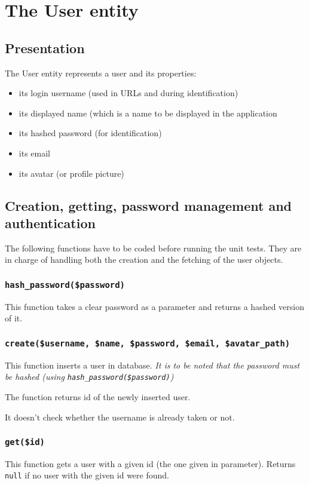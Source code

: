 \documentclass[twoside,a4paper,12pt]{article}
\begin{document}
\section{The User entity}

\subsection{Presentation}
The User entity represents a user and its properties:

\begin{itemize}
\item its login username (used in URLs and during identification)
\item its displayed name (which is a name to be displayed in the application
\item its hashed password (for identification)
\item its email
\item its avatar (or profile picture)
\end{itemize}

\subsection{Creation, getting, password management and authentication}
The following functions have to be coded before running the unit tests. They are in charge of handling both the creation and the fetching of the user objects.

\subsubsection{\texttt{hash\_password(\$password)}}
This function takes a clear password as a parameter and returns a hashed version of it.

\subsubsection{\texttt{create(\$username, \$name, \$password, \$email, \$avatar\_path)}}

This function inserts a user in database. \textit{It is to be noted that the password must be hashed (using \texttt{hash\_password(\$password)})}

The function returns id of the newly inserted user.

It doesn't check whether the username is already taken or not.

\subsubsection{\texttt{get(\$id)}}
This function gets a user with a given id (the one given in parameter). Returns \texttt{null} if no user with the given id were found.
\end{document}

